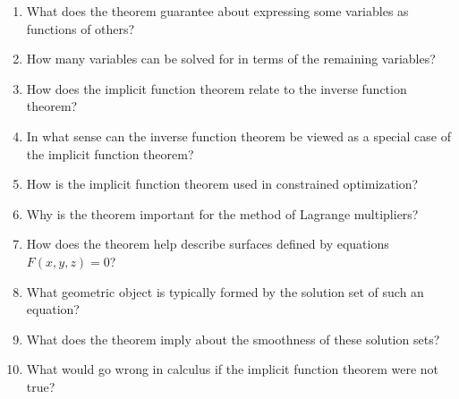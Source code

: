 \begin{enumerate}
  \item What does the theorem guarantee about expressing some variables as functions of others?
  \item How many variables can be solved for in terms of the remaining variables?
  \item How does the implicit function theorem relate to the inverse function theorem?
  \item In what sense can the inverse function theorem be viewed as a special case of the implicit function theorem?
  \item How is the implicit function theorem used in constrained optimization?
  \item Why is the theorem important for the method of Lagrange multipliers?
  \item How does the theorem help describe surfaces defined by equations \(F(x,y,z)=0\)?
  \item What geometric object is typically formed by the solution set of such an equation?
  \item What does the theorem imply about the smoothness of these solution sets?
  \item What would go wrong in calculus if the implicit function theorem were not true?
\end{enumerate}
